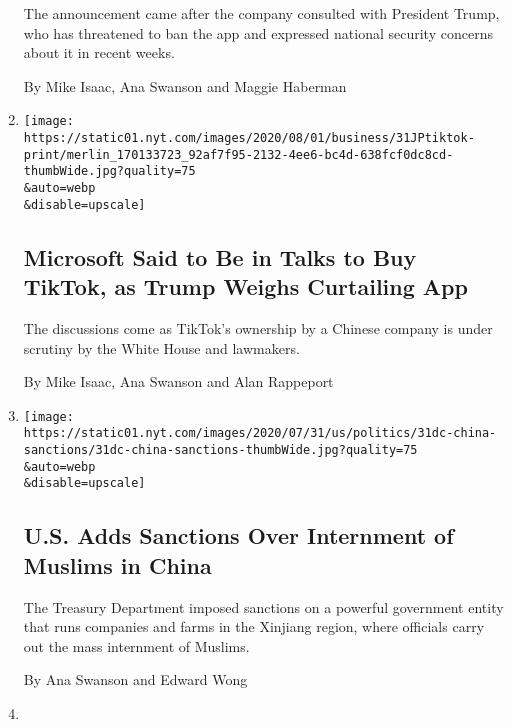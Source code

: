 \begin{enumerate}
  The announcement came after the company consulted with President
  Trump, who has threatened to ban the app and expressed national
  security concerns about it in recent weeks.

  By Mike Isaac, Ana Swanson and Maggie Haberman
\item
  \href{/2020/07/31/technology/tiktok-microsoft.html}{}

  \texttt{[image: https://static01.nyt.com/images/2020/08/01/business/31JPtiktok-print/merlin\_170133723\_92af7f95-2132-4ee6-bc4d-638fcf0dc8cd-thumbWide.jpg?quality=75\\\&auto=webp\\\&disable=upscale]}

  \hypertarget{microsoft-said-to-be-in-talks-to-buy-tiktok-as-trump-weighs-curtailing-app}{%
  \subsection{Microsoft Said to Be in Talks to Buy TikTok, as Trump
  Weighs Curtailing
  App}\label{microsoft-said-to-be-in-talks-to-buy-tiktok-as-trump-weighs-curtailing-app}}

  The discussions come as TikTok's ownership by a Chinese company is
  under scrutiny by the White House and lawmakers.

  By Mike Isaac, Ana Swanson and Alan Rappeport
\item
  \href{/2020/07/31/us/politics/sanctions-china-xinjiang-uighurs.html}{}

  \texttt{[image: https://static01.nyt.com/images/2020/07/31/us/politics/31dc-china-sanctions/31dc-china-sanctions-thumbWide.jpg?quality=75\\\&auto=webp\\\&disable=upscale]}

  \hypertarget{us-adds-sanctions-over-internment-of-muslims-in-china}{%
  \subsection{U.S. Adds Sanctions Over Internment of Muslims in
  China}\label{us-adds-sanctions-over-internment-of-muslims-in-china}}

  The Treasury Department imposed sanctions on a powerful government
  entity that runs companies and farms in the Xinjiang region, where
  officials carry out the mass internment of Muslims.

  By Ana Swanson and Edward Wong
\item
  \href{/live/2020/07/31/business/stock-market-today-coronavirus/us-sanctions-more-chinese-officials-over-human-rights-violations-as-tensions-flare}{}


\end{enumerate}
